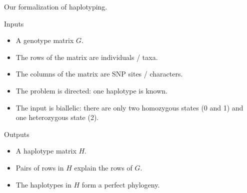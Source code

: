 \documentclass[aspectratio=169]{beamer}
\begin{document}
\begin{frame}[t]{Our formalization of haplotyping.}
  \begin{block}{Inputs}
    \begin{itemize}
    \item A genotype matrix $G$.
    \item The rows of the matrix are individuals / taxa.
    \item The columns of the matrix are SNP sites / characters.
    \item<alert@1->
      The problem is directed: one haplotype is known.
    \item<alert@1->
      The input is biallelic: there are only two homozygous
      states (0 and 1) and one heterozygous state (2).
    \end{itemize}
  \end{block}
  \begin{block}{Outputs}
    \begin{itemize}
    \item A haplotype matrix $H$.
    \item Pairs of rows in $H$ explain the rows of $G$.
    \item<alert@1> The haplotypes in $H$ form a perfect phylogeny.
    \end{itemize}
  \end{block}
\end{frame}
\end{document}
